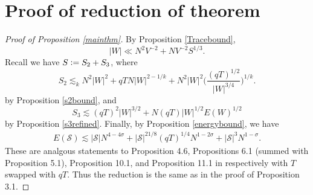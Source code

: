 \section{Proof of reduction of theorem}
\begin{proof}[Proof of Proposition \ref{mainthm}]
    By Proposition \ref{Tracebound},
\[    |W|\ll N^2 V^{-2} + N V^{-2} S^{1/3}.\]
Recall we have $S\mathrel{\mathop:}= S_2+S_3$, where 
\[
    S_2 \lesssim_k N^2|W|^2 + qTN|W|^{2-1/k} + N^2|W|^2 \Big(\frac{(qT)^{1/2}}{|W|^{3/4}}\Big)^{1/k}.
\]
    by Proposition \ref{s2bound}, and
    \[
        S_3\lesssim (qT)^2|W|^{3/2} + N(qT)|W|^{1/2}E(W)^{1/2} 
    \]
    by Proposition \ref{s3refined}.
    Finally, by Proposition \ref{energybound}, we have
    \begin{align*}
E(\mathcal{S})\lesssim |\mathcal{S}|N^{4-4\sigma}+|\mathcal{S}|^{21/8}(qT)^{1/4}N^{1-2\sigma}+|\mathcal{S}|^3N^{1-\sigma}.
    \end{align*}
    These are analgous statements to Proposition 4.6, Propositions 6.1 (summed with Proposition 5.1), Proposition 10.1, and Proposition 11.1 in \cite{GM2024} respectively with 
    $T$ swapped with $qT$. Thus the reduction is the same as in the proof of Proposition 3.1.
\end{proof}